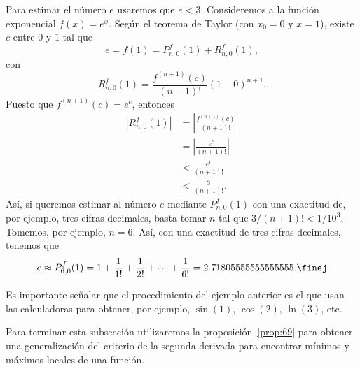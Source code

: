 \documentclass[12pt,a4paper]{book}
\begin{document}
    \begin{ejemplo}\label{ejm:107}
        Para estimar el número $e$ usaremos
        que $e<3$. Consideremos a la función exponencial $f(x)=e^{x}$. Según
        el teorema de Taylor (con $x_{0}=0$ y $x=1$), existe $c$ entre $0$ y $1$ tal que
        \begin{equation*}
            e=f(1)=P^{f}_{n,0}(1)+R^{f}_{n,0}(1),
        \end{equation*}
        con
        \begin{equation*}
            R^{f}_{n,0}(1)=\frac{f^{(n+1)}(c)}{(n+1)!}(1-0)^{n+1}.
        \end{equation*}
        Puesto que $f^{(n+1)}(c)=e^{c}$, entonces
        \begin{align*}
            \left|R^{f}_{n,0}(1)\right|&=\left|\frac{f^{(n+1)}(c)}{(n+1)!}\right|\\
            &=\left|\frac{e^{c}}{(n+1)!}\right|\\
            &<\frac{e^{1}}{(n+1)!}\\
            &<\frac{3}{(n+1)!}.
        \end{align*}
        Así, si queremos estimar al número $e$ mediante $P^{f}_{n,0}(1)$ con una exactitud de,
        por ejemplo, tres cifras decimales, basta tomar $n$ tal que $3/(n+1)!<1/10^{3}$.
        Tomemos, por ejemplo, $n=6$. Así, con una exactitud de tres cifras decimales,
        tenemos que
        \begin{equation*}
            e\approx P^{f}_{6,0}(1)=1+\frac{1}{1!}+\frac{1}{2!}+\cdots+\frac{1}{6!}=2.71805555555555555.\finej
        \end{equation*}
    \end{ejemplo}

    Es importante señalar que el procedimiento del ejemplo anterior es el que
    usan las calculadoras para obtener, por ejemplo, $\sin(1)$, $\cos(2)$, $\ln(3)$, etc.

    Para terminar esta subsección utilizaremos la proposición~\ref{prop:69} para obtener
    una generalización del criterio de la segunda derivada para encontrar mínimos
    y máximos locales de una función.
\end{document}
